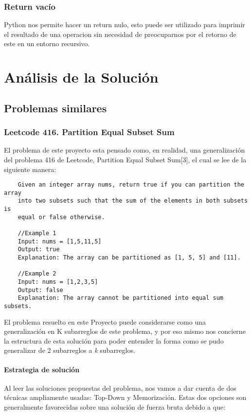 \documentclass[a4paper]{article}
\begin{document}
\subsubsection{Return vacío}
Python nos permite hacer un return nulo, esto puede ser utilizado para imprimir el
resultado de una operacion sin necesidad de preocuparnos por el retorno de este en un
entorno recursivo.

\section{Análisis de la Solución}
\subsection{Problemas similares}
\subsubsection{Leetcode 416. Partition Equal Subset Sum}
El problema de este proyecto esta pensado como, en realidad, una generalización
del problema 416 de Leetcode, Partition Equal Subset Sum[3], el cual se lee de la siguiente manera:

\begin{verbatim}
    Given an integer array nums, return true if you can partition the array
    into two subsets such that the sum of the elements in both subsets is 
    equal or false otherwise.

    //Example 1
    Input: nums = [1,5,11,5]
    Output: true
    Explanation: The array can be partitioned as [1, 5, 5] and [11].

    //Example 2
    Input: nums = [1,2,3,5]
    Output: false
    Explanation: The array cannot be partitioned into equal sum subsets.
\end{verbatim} 

El problema resuelto en este Proyecto puede considerarse como una generalización en
K subarreglos de este problema, y por eso mismo nos concierne la estructura de esta 
solución para poder entender la forma como se pudo generalizar de 2 subarreglos a \textit{k}
subarreglos.

\paragraph{Estrategia de solución}
Al leer las soluciones propuestas del problema, nos vamos a dar cuenta de dos 
técnicas ampliamente usadas: Top-Down y Memorización. Estas dos opciones son
generalmente favorecidas sobre una solución de fuerza bruta debido a que:
\end{document}
